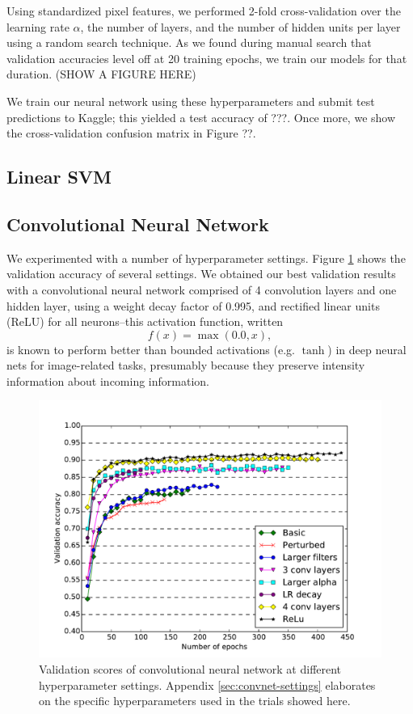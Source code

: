 \documentclass{acm_proc_article-sp}
\begin{document}
Using standardized pixel features, we performed 2-fold cross-validation over the learning rate $\alpha$, the number of layers, and the number of hidden units per layer using a random search technique. As we found during manual search that validation accuracies level off at 20 training epochs, we train our models for that duration. (SHOW A FIGURE HERE)

We train our neural network using these hyperparameters and submit test predictions to Kaggle; this yielded a test accuracy of ???. Once more, we show the cross-validation confusion matrix in Figure ??.

\subsection{Linear SVM}


\subsection{Convolutional Neural Network}
We experimented with a number of hyperparameter settings. Figure \ref{fig:convnet-compare} shows the validation accuracy of several settings. We obtained our best validation results with a convolutional neural network comprised of 4 convolution layers and one hidden layer, using a weight decay factor of 0.995, and rectified linear units (ReLU)  for all neurons--this activation function, written $$f(x) = \max(0.0, x),$$ is known to perform better than bounded activations (e.g. $\tanh$) in deep neural nets for image-related tasks, presumably because they preserve intensity information about incoming information.\cite{Nair}

\begin{figure}[h!]
	\centering
	\includegraphics[width=\linewidth]{convnet_comparison}
  	\caption{Validation scores of convolutional neural network at different hyperparameter settings. Appendix \ref{sec:convnet-settings} elaborates on the specific hyperparameters used in the trials showed here.}
  	\label{fig:convnet-compare}
\end{figure}
\end{document}
